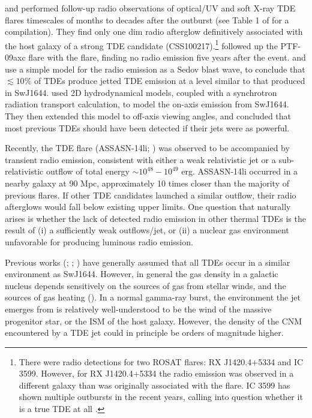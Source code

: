 \documentclass[usenatbib,fleqn]{mnras}
\begin{document}
\citet{Bower+2013} and \citet{van-Velzen+2013} performed follow-up
radio observations of optical/UV and soft X-ray TDE flares timescales
of months to decades after the outburst (see Table 1 of
\citealt{Mimica+2015} for a compilation). They find only one dim radio
afterglow definitively associated with the host galaxy of a strong TDE
candidate (CSS100217).\footnote{There were radio detections for two
  ROSAT flares: RX J1420.4+5334 and IC 3599. However, for RX
  J1420.4+5334 the radio emission was observed in a different galaxy
  than was originally associated with the flare.  IC 3599 has shown
  multiple outbursts in the recent years, calling into question
  whether it is a true TDE at all \citep{Campana+2015}.}
\citet{Arcavi+2014} followed up the PTF-09axc flare with the flare,
finding no radio emission five years after the
event. \citet{Bower+2013} and \citet{van-Velzen+2013} use a simple
model for the radio emission as a Sedov blast wave, to conclude that
$\lesssim 10\%$ of TDEs produce jetted TDE emission at a level similar
to that produced in SwJ1644.  \citet{Mimica+2015} used 2D
hydrodynamical models, coupled with a synchrotron radiation transport
calculation, to model the on-axis emission from SwJ1644. They then
extended this model to off-axis viewing angles, and concluded that
most previous TDEs should have been detected if their jets were as
powerful.

Recently, the TDE flare (ASSASN-14li; \citealt{Holoien+2016a}) was
observed to be accompanied by transient radio emission, consistent
with either a weak relativistic jet \citep{van-Velzen+2015} or a
sub-relativistic outflow \citep{Alexander+2015} of total energy $\sim
10^{48}-10^{49}$ erg.  ASSASN-14li occurred in a nearby galaxy at 90
Mpc, approximately 10 times closer than the majority of previous
flares.  If other TDE candidates launched a similar outflow, their
radio afterglows would fall below existing upper limits.  One question
that naturally arises is whether the lack of detected radio emission
in other thermal TDEs is the result of (i) a sufficiently weak
outflows/jet, or (ii) a nuclear gas environment unfavorable for
producing luminous radio emission.

Previous works (\citealt{Bower+2013}; \citealt{van-Velzen+2013};
\citealt{Mimica+2015}) have generally assumed that all TDEs occur in a
similar environment as SwJ1644.  However, in general the
gas density in a galactic nucleus depends sensitively on the sources
of gas from stellar winds, and the sources of gas heating
(\citealt{Quataert2004,Generozov+2015}).  In a normal gamma-ray burst, the
environment the jet emerges from is relatively well-understood to be
the wind of the massive progenitor star, or the ISM of the host
galaxy.  However, the density of the CNM encountered by a TDE jet
could in principle be orders of magnitude higher.
\end{document}
